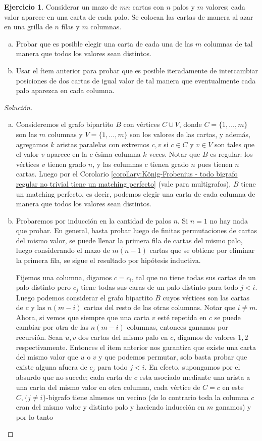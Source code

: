\documentclass[12pt]{report}
\theoremstyle{plain}
\theoremstyle{definition}
\newtheorem{exercise}[theorem]{Ejercicio}
\newenvironment{solution}{\begin{proof}[Solución]}{\end{proof}}
\begin{document}
\begin{exercise}
Considerar un mazo de $mn$ cartas con $n$ palos y $m$ valores; cada valor aparece en una carta de cada palo. Se colocan las cartas de manera al azar en una grilla de $n$ filas y $m$ columnas.
\begin{enumerate}[(a)]
\item Probar que es posible elegir una carta de cada una de las $m$ columnas de tal manera que todos los valores sean distintos.
\item Usar el ítem anterior para probar que es posible iteradamente de intercambiar posiciones de dos cartas de igual valor de tal manera que eventualmente cada palo aparezca en cada columna.
\end{enumerate}
\end{exercise}
\begin{solution}
\begin{enumerate}[(a)]
\item Consideremos el grafo bipartito $B$ con vértices $C \cup V$, donde $C = \{1, \ldots, m\}$ son las $m$ columnas y $V = \{1, \ldots, m\}$ son los valores de las cartas, y además, agregamos $k$ aristas paralelas con extremos $c,v$ si $c \in C$ y $v \in V$ son tales que el valor $v$ aparece en la $c$-ésima columna $k$ veces. Notar que $B$ es regular: los vértices $v$ tienen grado $n$, y las columnas $c$ tienen grado $n$ pues tienen $n$ cartas. Luego por el Corolario \ref{corollary:König-Frobenius - todo bigrafo regular no trivial tiene un matching perfecto} (vale para multigrafos), $B$ tiene un matching perfecto, es decir, podemos elegir una carta de cada columna de manera que todos los valores sean distintos.
\item Probaremos por inducción en la cantidad de palos $n$. Si $n = 1$ no hay nada que probar. En general, basta probar luego de finitas permutaciones de cartas del mismo valor, se puede llenar la primera fila de cartas del mismo palo, luego considerando el mazo de $m (n-1)$ cartas que se obtiene por eliminar la primera fila, se sigue el resultado por hipótesis inductiva.

Fijemos una columna, digamos $c = c_i$, tal que no tiene todas sus cartas de un palo distinto pero $c_{j}$ tiene todas sus caras de un palo distinto para todo $j < i$. Luego podemos considerar el grafo bipartito $B$ cuyos vértices son las cartas de $c$ y las $n(m-i)$ cartas del resto de las otras columnas. Notar que $i \neq m$. Ahora, si vemos que siempre que una carta $v$ esté repetida en $c$ se puede cambiar por otra de las $n(m-i)$ columnas, entonces ganamos por recursión. Sean $u,v$ dos cartas del mismo palo en $c$, digamos de valores $1,2$ respectivamente. Entonces el ítem anterior nos garantiza que existe una carta del mismo valor que $u$ o $v$ y que podemos permutar, solo basta probar que existe alguna afuera de $c_j$ para todo $j < i$. En efecto, supongamos por el absurdo que no sucede; cada carta de $c$ esta asociado mediante una arista a una carta del mismo valor en otra columna, cada vértice de $C = c$ en este $C, \{j \neq i \}$-bigrafo tiene almenos un vecino (de lo contrario toda la columna $c$ eran del mismo valor y distinto palo y haciendo inducción en $m$ ganamos) y por lo tanto $ $


\end{enumerate}
\end{solution}
\end{document}
